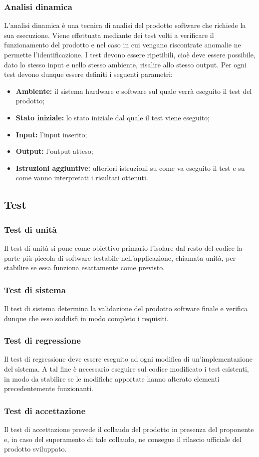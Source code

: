 \documentclass[../NormeDiProgetto.tex]{subfiles}
\begin{document}
\subsubsection{Analisi dinamica}
L’analisi dinamica è una tecnica di analisi del prodotto software che richiede la sua esecuzione. Viene effettuata mediante dei test volti a verificare il funzionamento del prodotto e nel
caso in cui vengano riscontrate anomalie ne permette l’identificazione.
I test devono essere ripetibili, cioè deve essere possibile, dato lo stesso input e nello
stesso ambiente, risalire allo stesso output. Per ogni test devono dunque essere definiti
i seguenti parametri:
\begin{itemize}
\item \textbf{Ambiente:} il sistema hardware e software sul quale verrà eseguito il test del
prodotto;
\item \textbf{Stato iniziale:} lo stato iniziale dal quale il test viene eseguito;
\item \textbf{Input:} l’input inserito;
\item \textbf{Output:} l’output atteso;
\item \textbf{Istruzioni aggiuntive:} ulteriori istruzioni su come va eseguito il test e su come
vanno interpretati i risultati ottenuti.
\end{itemize}
\subsection{Test}
\subsubsection{Test di unità}
Il test di unità si pone come obiettivo primario l’isolare dal resto del codice la parte
più piccola di software testabile nell’applicazione, chiamata unità, per stabilire se essa
funziona esattamente come previsto.
\subsubsection{Test di sistema}
Il test di sistema determina la validazione del prodotto software finale e verifica dunque che esso soddisfi in modo completo i requisiti.
\subsubsection{Test di regressione}
Il test di regressione deve essere eseguito ad ogni modifica di un’implementazione del
sistema. A tal fine è necessario eseguire sul codice modificato i test esistenti, in modo da
stabilire se le modifiche apportate hanno alterato elementi precedentemente funzionanti.
\subsubsection{Test di accettazione}
Il test di accettazione prevede il collaudo del prodotto in presenza del proponente e,
in caso del superamento di tale collaudo, ne consegue il rilascio ufficiale del prodotto
sviluppato.
\end{document}
